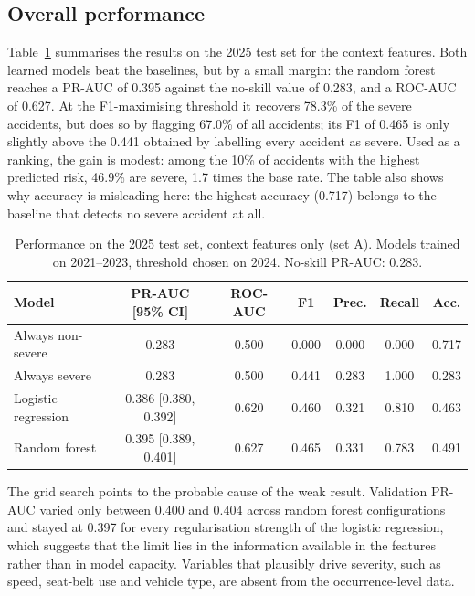 \documentclass[12pt]{article}
\begin{document}
\subsection{Overall performance}

Table~\ref{tab:main} summarises the results on the 2025 test set for the
context features. Both learned models beat the baselines, but by a small
margin: the random forest reaches a PR-AUC of 0.395 against the no-skill value
of 0.283, and a ROC-AUC of 0.627. At the F1-maximising threshold it recovers
78.3\% of the severe accidents, but does so by flagging 67.0\% of all
accidents; its F1 of 0.465 is only slightly above the 0.441 obtained by
labelling every accident as severe. Used as a ranking, the gain is modest:
among the 10\% of accidents with the highest predicted risk, 46.9\% are severe,
1.7 times the base rate. The table also shows why accuracy is misleading here:
the highest accuracy (0.717) belongs to the baseline that detects no severe
accident at all.

\begin{table}[ht]
\centering
\caption{Performance on the 2025 test set, context features only (set A).
Models trained on 2021--2023, threshold chosen on 2024. No-skill PR-AUC: 0.283.}
\label{tab:main}
\small
\begin{tabular}{lcccccc}
\toprule
Model & PR-AUC [95\% CI] & ROC-AUC & F1 & Prec. & Recall & Acc. \\
\midrule
Always non-severe   & 0.283                & 0.500 & 0.000 & 0.000 & 0.000 & 0.717 \\
Always severe       & 0.283                & 0.500 & 0.441 & 0.283 & 1.000 & 0.283 \\
Logistic regression & 0.386 [0.380, 0.392] & 0.620 & 0.460 & 0.321 & 0.810 & 0.463 \\
Random forest       & 0.395 [0.389, 0.401] & 0.627 & 0.465 & 0.331 & 0.783 & 0.491 \\
\bottomrule
\end{tabular}
\end{table}

The grid search points to the probable cause of the weak result. Validation
PR-AUC varied only between 0.400 and 0.404 across random forest configurations
and stayed at 0.397 for every regularisation strength of the logistic
regression, which suggests that the limit lies in the information available in
the features rather than in model capacity. Variables that plausibly drive
severity, such as speed, seat-belt use and vehicle type, are absent from the
occurrence-level data.
\end{document}
